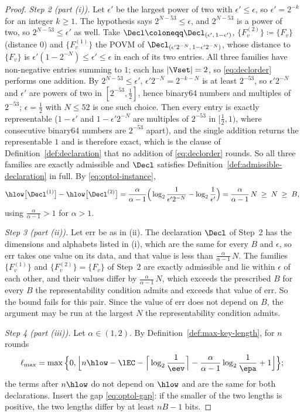 \begin{proof}
\emph{Step 2 (part (i)).} Let $\epsilon'$ be the largest power of two
with $\epsilon'\le\epsilon$, so $\epsilon'=2^{-k}$ for an integer
$k\ge1$. The hypothesis says $2^{N-53}\le\epsilon$, and $2^{N-53}$ is a
power of two, so $2^{N-53}\le\epsilon'$ as well. Take
$\Decl\coloneqq\Decl_{(\epsilon',\,1-\epsilon')}$,
$\{F^{(2)}_v\}\coloneqq\{F_v\}$ (distance $0$) and $\{F^{(1)}_v\}$ the
POVM of $\Decl_{(\epsilon'2^{-N},\,1-\epsilon'2^{-N})}$, whose distance to
$\{F_v\}$ is $\epsilon'(1-2^{-N})\le\epsilon'\le\epsilon$ in each of its
two entries. All three families have non-negative entries summing to $1$;
each has $|\Vset|=2$, so \eqref{eq:declorder} performs one addition. By
$2^{N-53}\le\epsilon'$, $\epsilon'2^{-N}=2^{-k-N}$ is at least $2^{-53}$,
so $\epsilon'2^{-N}$ and $\epsilon'$ are powers of two in
$[2^{-53},\tfrac12]$, hence binary64 numbers and multiples of $2^{-53}$;
$\epsilon=\tfrac12$ with $N\le52$ is one such choice. Then every entry is
exactly representable ($1-\epsilon'$ and $1-\epsilon'2^{-N}$ are
multiples of $2^{-53}$ in $[\tfrac12,1)$, where consecutive binary64
numbers are $2^{-53}$ apart), and the single addition returns the
representable $1$ and is therefore exact, which is the clause of
Definition~\ref{def:declaration} that no addition of \eqref{eq:declorder}
rounds. So all three families are exactly admissible and $\Decl$
satisfies Definition~\ref{def:admissible-declaration} in full. By \eqref{eq:optol-instance},
\begin{equation*}
  \hlow\big[\Decl^{(1)}\big]-\hlow\big[\Decl^{(2)}\big]
  =\frac{\alpha}{\alpha-1}
  \Big(\log_2\frac{1}{\epsilon'2^{-N}}-\log_2\frac1{\epsilon'}\Big)
  =\frac{\alpha}{\alpha-1}\,N\;\ge\;N\;\ge\;B ,
\end{equation*}
using $\frac{\alpha}{\alpha-1}>1$ for $\alpha>1$.

\emph{Step 3 (part (ii)).} Let $\mathrm{err}$ be as in (ii). The
declaration $\Decl$ of Step~2 has the dimensions and alphabets listed in
(i), which are the same for every $B$ and $\epsilon$, so $\mathrm{err}$
takes one value on its data, and that value is less than
$\frac{\alpha}{\alpha-1}\,N$. The families $\{F^{(1)}_v\}$ and
$\{F^{(2)}_v\}=\{F_v\}$ of Step~2 are exactly admissible and lie within
$\epsilon$ of each other, and their values differ by
$\frac{\alpha}{\alpha-1}\,N$, which exceeds the prescribed $B$ for every
$B$ the representability condition admits and exceeds that value of
$\mathrm{err}$. So the bound fails for this pair. Since the value of
$\mathrm{err}$ does not depend on $B$, the argument may be run at the
largest $N$ the representability condition admits.

\emph{Step 4 (part (iii)).} Let $\alpha\in(1,2)$. By
Definition~\ref{def:max-key-length}, for $n$ rounds
\begin{equation*}
  \ell_{\max}=\max\Big\{0,\Big\lfloor n\hlow-\lEC
  -\Big\lceil\log_2\frac1{\eev}\Big\rceil
  -\frac{\alpha}{\alpha-1}\log_2\frac1{\epa}+1\Big\rfloor\Big\};
\end{equation*}
the terms after $n\hlow$ do not depend on $\hlow$ and are the same for
both declarations. Insert the gap \eqref{eq:optol-gap}: if the smaller of the
two lengths is positive, the two lengths differ by at least $nB-1$ bits.
\end{proof}
